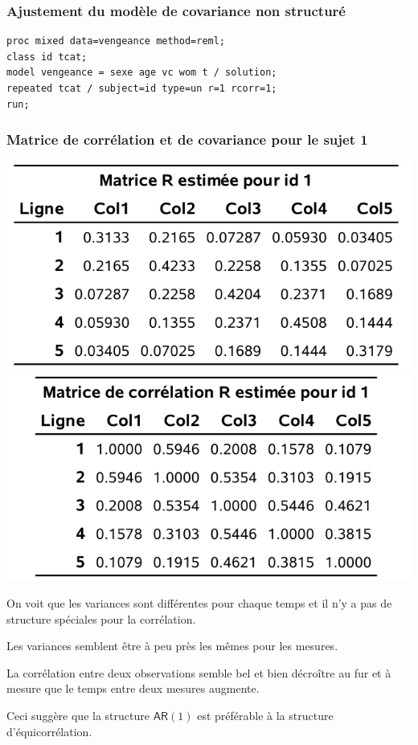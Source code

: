 \documentclass{beamer}
\begin{document}
\begin{frame}[fragile]
\frametitle{Ajustement du modèle de covariance non structuré}
 
\begin{tcolorbox}[colback=white, colframe=hecblue, title=Code \SASlang{} pour ajuster un modèle non structuré]
\begin{verbatim}
proc mixed data=vengeance method=reml;
class id tcat;
model vengeance = sexe age vc wom t / solution;
repeated tcat / subject=id type=un r=1 rcorr=1;
run;
\end{verbatim}
\end{tcolorbox}
\end{frame}


\begin{frame}
\frametitle{Matrice de corrélation et de covariance pour le sujet 1}
\begin{center}
\includegraphics[width = 0.45\linewidth]{img/c5/diapos6-e21a}
\includegraphics[width = 0.45\linewidth]{img/c5/diapos6-e21b}
\end{center}
\bi
\item On voit que les variances sont différentes pour chaque temps et il n'y a pas de structure spéciales pour la corrélation.
\be

\item Les variances semblent être à peu près les mêmes pour les mesures. 
\item La corrélation entre deux observations semble bel et bien
décroître au fur et à mesure que le temps entre deux mesures augmente. 
\ee
\item Ceci suggère que la structure $\mathsf{AR}(1)$ est préférable à la structure d'équicorrélation.
\ei
\end{frame}
\end{document}
